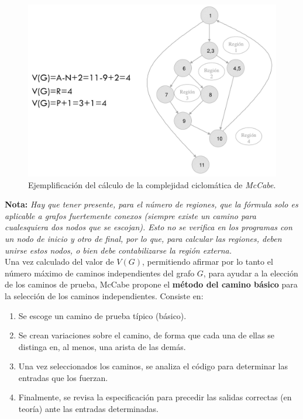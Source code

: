 \begin{figure}[H]
    \centering
    \includegraphics[width=0.9\linewidth]{Resources/Tema6/Ejemplo_McCabe.png}
    \caption{Ejemplificación del cálculo de la complejidad ciclomática de \textit{McCabe}.}
\end{figure}

\textbf{Nota:} \textit{Hay que tener presente, para el número de regiones, que la fórmula solo es aplicable a grafos fuertemente conexos (siempre existe un camino para cualesquiera dos nodos que se escojan). Esto no se verifica en los programas con un nodo de inicio y otro de final, por lo que, para calcular las regiones, deben unirse estos nodos, o bien debe contabilizarse la región externa.}\\

Una vez calculado del valor de $V (G)$, permitiendo afirmar por lo tanto el número máximo de caminos independientes del grafo $G$, para ayudar a la elección de los caminos de prueba, McCabe propone el \textbf{método del camino básico} para la selección de los caminos independientes. Consiste en:

\begin{enumerate}
    \item Se escoge un camino de prueba típico (básico).
    \item Se crean variaciones sobre el camino, de forma que cada una de ellas se distinga en, al menos, una arista de las demás.
    \item Una vez seleccionados los caminos, se analiza el código para determinar las entradas que los fuerzan.
    \item Finalmente, se revisa la especificación para precedir las salidas correctas (en teoría) ante las entradas determinadas.
\end{enumerate}

